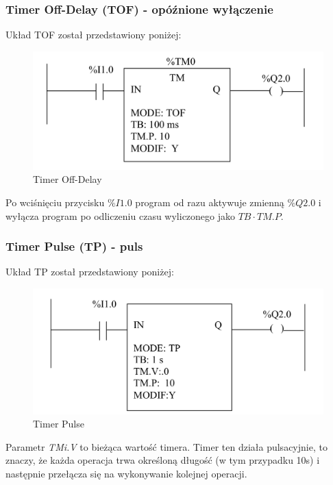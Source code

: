 \documentclass[12pt]{article}
\begin{document}
\subsubsection{Timer Off-Delay (TOF) - opóźnione wyłączenie}

Układ TOF został przedstawiony poniżej:

\begin{figure}[H]
    \centering
    \includegraphics[scale=0.25]{tof.png}
    \caption{Timer Off-Delay}
\end{figure}

Po wciśnięciu przycisku $\%I1.0$ program od razu aktywuje zmienną $\%Q2.0$ i wyłącza program po odliczeniu czasu wyliczonego jako $ TB \cdot TM.P $. 

\subsubsection{Timer Pulse (TP) - puls}

Układ TP został przedstawiony poniżej:

\begin{figure}[H]
    \centering
    \includegraphics[scale=0.25]{tp.png}
    \caption{Timer Pulse}
\end{figure}

Parametr \textit{TMi.V} to bieżąca wartość timera. Timer ten działa pulsacyjnie, to znaczy, że każda operacja trwa określoną długość (w tym przypadku 10s) i następnie przełącza się na wykonywanie kolejnej operacji. 
\end{document}
